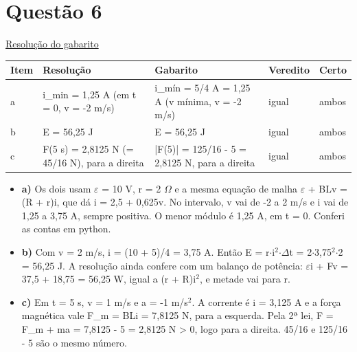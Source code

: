 \documentclass{article}%
\begin{document}
\section*{Questão 6}%
\href{https://poliedroresolve.sistemapoliedro.com.br/vestibulares/ime/2026/ime-2-fase-dia-2-24-10-2025-2-fase-dia-2/dissertativa-6-fisica-2-fase-dia-2-ime-2026}{Resolução do gabarito}\par\smallskip%
\begin{longtable}{@{}p{} p{} p{} p{} p{}@{}}\toprule Item & Resolução & Gabarito & Veredito & Certo \\ \midrule
a & i\_min = 1,25 A (em t = 0, v = -2 m/s) & i\_mín = 5/4 A = 1,25 A (v mínima, v = -2 m/s) & igual & ambos \\
b & E = 56,25 J & E = 56,25 J & igual & ambos \\
c & F(5 s) = 2,8125 N (= 45/16 N), para a direita & |F(5)| = 125/16 - 5 = 2,8125 N, para a direita & igual & ambos \\
\bottomrule\end{longtable}%
\begin{itemize}%
\item%
\textbf{a)} Os dois usam $\varepsilon$ = 10 V, r = 2 $\Omega$ e a mesma equação de malha $\varepsilon$ + BLv = (R + r)i, que dá i = 2,5 + 0,625v. No intervalo, v vai de -2 a 2 m/s e i vai de 1,25 a 3,75 A, sempre positiva. O menor módulo é 1,25 A, em t = 0. Conferi as contas em python.%
\item%
\textbf{b)} Com v = 2 m/s, i = (10 + 5)/4 = 3,75 A. Então E = r$\cdot$i$^2$$\cdot$$\Delta$t = 2$\cdot$3,75$^2$$\cdot$2 = 56,25 J. A resolução ainda confere com um balanço de potência: $\varepsilon$i + Fv = 37,5 + 18,75 = 56,25 W, igual a (r + R)i$^2$, e metade vai para r.%
\item%
\textbf{c)} Em t = 5 s, v = 1 m/s e a = -1 m/s$^2$. A corrente é i = 3,125 A e a força magnética vale F\_m = BLi = 7,8125 N, para a esquerda. Pela 2ª lei, F = F\_m + ma = 7,8125 - 5 = 2,8125 N > 0, logo para a direita. 45/16 e 125/16 - 5 são o mesmo número.%
\end{itemize}%
\end{document}
